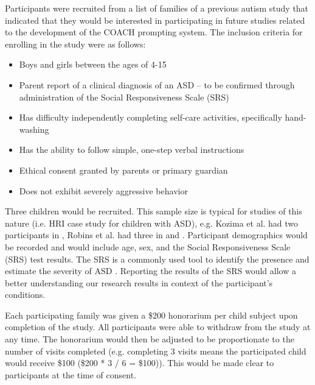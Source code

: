 Participants were recruited from a list of families of a previous autism study that indicated that they would be interested in participating in future studies related to the development of the COACH prompting system.  The inclusion criteria for enrolling in the study were as follows:
\begin{itemize}
	\item Boys and girls between the ages of 4-15
	\item Parent report of a clinical diagnosis of an ASD – to be confirmed through administration of the Social Responsiveness Scale (SRS)
	\item Has difficulty independently completing self-care activities, specifically hand-washing
	\item Has the ability to follow simple, one-step verbal instructions
	\item Ethical consent  granted by parents or primary guardian
	\item Does not exhibit severely aggressive behavior
\end{itemize}
Three children would be recruited. This sample size is typical for studies of this nature (i.e. HRI case study for children with ASD), e.g. Kozima et al. had two participants in
\cite{kozima2005interactive}, Robins et al. had three in \cite{robins2004robot} and \cite{robins2009isolation}.  Participant demographics would be recorded and would include age, sex, and the Social Responsiveness Scale (SRS) test results.  The SRS is a commonly used tool to identify the presence and estimate the severity of ASD \cite{constantino2002social}. Reporting the results of the SRS would allow a better understanding our research results in context of the participant's conditions.

Each participating family was given a \$200 honorarium per child subject upon completion of the study. All participants were able to withdraw from the study at any time. The honorarium would then be adjusted to be proportionate to the number of visits completed (e.g. completing 3 visits means the participated child would receive \$100 (\$200 * 3 / 6 = \$100)). This would be made clear to participants at the time of consent.